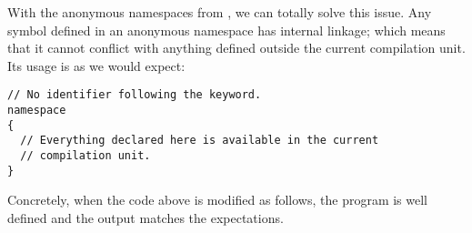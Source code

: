 \bigskip

With the anonymous namespaces from , we can totally solve this
issue. Any symbol defined in an anonymous namespace has internal
linkage; which means that it cannot conflict with anything defined
outside the current compilation unit. Its usage is as we would expect:

\begin{lstlisting}
// No identifier following the keyword.
namespace
{
  // Everything declared here is available in the current
  // compilation unit.
}
\end{lstlisting}

Concretely, when the code above is modified as follows, the program
is well defined and the output matches the expectations.




